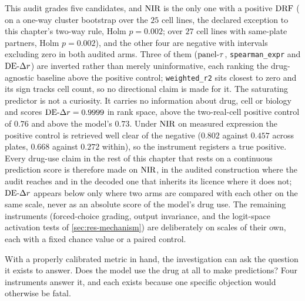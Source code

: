 \begin{claim}
This audit grades five candidates, and $\textrm{NIR}$ is the only
one with a positive $\textrm{DRF}$ ( on a one-way cluster
bootstrap over the $25$ cell lines, the declared exception to this chapter's
two-way rule, Holm $p = 0.002$;  over $27$ cell lines
with same-plate partners, Holm $p = 0.002$), and the other four are negative with
intervals excluding zero in both audited arms. Three of them ($\textrm{panel-}\tau$,
\texttt{spearman\_expr} and $\textrm{DE-}\Delta r$) are inverted rather than merely
uninformative, each ranking the drug-agnostic baseline above the positive
control; \texttt{weighted\_r2} sits closest to zero and its sign tracks cell
count, so no directional claim is made for it. The saturating predictor is not a
curiosity. It carries no information about drug, cell or biology and scores
$\textrm{DE-}\Delta r = 0.9999$ in rank space, above the two-real-cell positive control of
$0.76$ and above the model's $0.73$. Under $\textrm{NIR}$ on measured expression the positive control is retrieved well clear of
the negative ($0.802$ against $0.457$ across plates, $0.668$ against $0.272$
within), so the instrument registers a true positive. Every drug-use claim in
the rest of this chapter that rests on a continuous prediction score is
therefore made on $\textrm{NIR}$, in the audited construction where the audit reaches
and in the decoded one that inherits its licence where it does not; $\textrm{DE-}\Delta r$
appears below only where two arms are compared with each other on the same
scale, never as an absolute score of the model's drug use. The remaining instruments (forced-choice grading,
output invariance, and the logit-space activation tests of
\cref{sec:res-mechanism}) are deliberately on scales of their own, each with a
fixed chance value or a paired control.
\end{claim}


\label{sec:methods-controls}   %


\begin{question}[2]
With a properly calibrated metric in hand, the investigation can ask the
question it exists to answer. Does the model use the drug at all to make predictions? Four
instruments answer it, and each exists because one specific objection would
otherwise be fatal.
\end{question}

